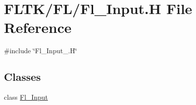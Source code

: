 \hypertarget{_fl___input_8_h}{}\section{F\+L\+T\+K/\+F\+L/\+Fl\+\_\+\+Input.H File Reference}
\label{_fl___input_8_h}
{\ttfamily \#include \char`\"{}Fl\+\_\+\+Input\+\_\+.\+H\char`\"{}}\newline
\subsection*{Classes}
\begin{DoxyCompactItemize}
\item 
class \hyperlink{class_fl___input}{Fl\+\_\+\+Input}
\end{DoxyCompactItemize}
